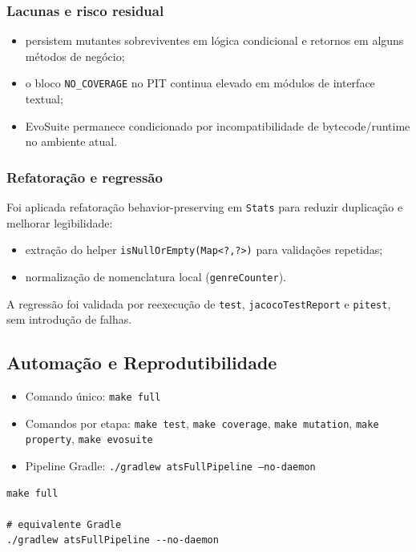 \documentclass{article}
\begin{document}
\subsubsection{Lacunas e risco residual}
\begin{itemize}
    \item persistem mutantes sobreviventes em lógica condicional e retornos em alguns métodos de negócio;
    \item o bloco \texttt{NO\_COVERAGE} no PIT continua elevado em módulos de interface textual;
    \item EvoSuite permanece condicionado por incompatibilidade de bytecode/runtime no ambiente atual.
\end{itemize}

\subsubsection{Refatoração e regressão}
Foi aplicada refatoração behavior-preserving em \texttt{Stats} para reduzir duplicação e melhorar legibilidade:
\begin{itemize}
    \item extração do helper \texttt{isNullOrEmpty(Map<?,?>)} para validações repetidas;
    \item normalização de nomenclatura local (\texttt{genreCounter}).
\end{itemize}

A regressão foi validada por reexecução de \texttt{test}, \texttt{jacocoTestReport} e \texttt{pitest}, sem introdução de falhas.

\subsection{Automação e Reprodutibilidade}
\begin{itemize}
    \item Comando único: \texttt{make full}
    \item Comandos por etapa: \texttt{make test}, \texttt{make coverage}, \texttt{make mutation}, \texttt{make property}, \texttt{make evosuite}
    \item Pipeline Gradle: \texttt{./gradlew atsFullPipeline --no-daemon}
\end{itemize}

\begin{lstlisting}[caption={Exemplo de pipeline end-to-end},label={lst:pipeline}]
make full

# equivalente Gradle
./gradlew atsFullPipeline --no-daemon
\end{lstlisting}
\end{document}
